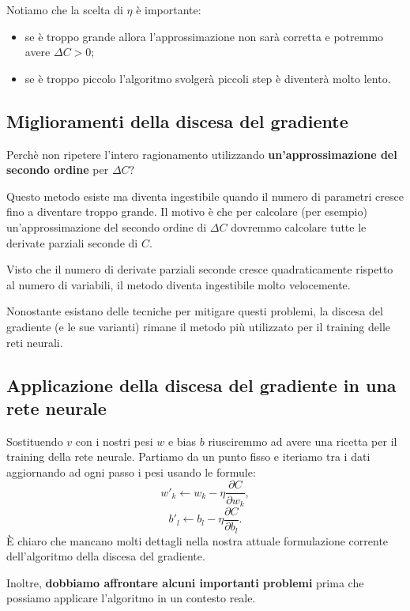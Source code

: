 Notiamo che la scelta di $\eta$ è importante:
\begin{itemize}
    \item se è troppo grande allora l’approssimazione non sarà corretta e potremmo avere $\Delta C>0$;
    \item se è troppo piccolo l’algoritmo svolgerà piccoli step è diventerà molto lento.
\end{itemize}
\subsection{Miglioramenti della discesa del gradiente}
Perchè non ripetere l'intero ragionamento utilizzando \textbf{un'approssimazione del secondo ordine} per $\Delta C$?


Questo metodo esiste ma diventa ingestibile quando il numero di parametri cresce fino a diventare troppo grande. Il motivo è che per calcolare (per esempio) un’approssimazione del secondo ordine di $\Delta C$ dovremmo calcolare tutte le derivate parziali seconde di $C$.



Visto che il numero di derivate parziali seconde cresce quadraticamente rispetto al numero di variabili, il metodo diventa ingestibile molto velocemente.


Nonostante esistano delle tecniche per mitigare questi problemi, la discesa del gradiente (e le sue varianti) rimane il metodo più utilizzato per il training delle reti neurali.


\subsection{Applicazione della discesa del gradiente in una rete neurale}
Sostituendo $v$ con i nostri pesi $w$ e bias $b$ riusciremmo ad avere una ricetta per il training della rete neurale. Partiamo da un punto fisso e iteriamo tra i dati aggiornando ad ogni passo i pesi usando le formule:
\begin{equation}
    w'_k\leftarrow w_k-\eta\frac{\partial C}{\partial w_k},
\end{equation}
\begin{equation}
    b'_l\leftarrow b_l-\eta\frac{\partial C}{\partial b_l}.
\end{equation}
È chiaro che mancano molti dettagli nella nostra attuale formulazione corrente dell’algoritmo della discesa del gradiente.



Inoltre, \textbf{dobbiamo affrontare alcuni importanti problemi}  prima che possiamo applicare l’algoritmo in un contesto reale.



